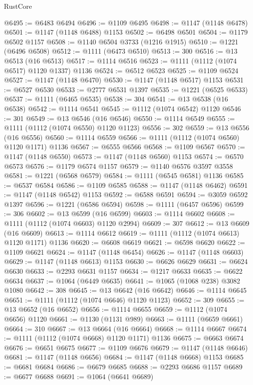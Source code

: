 \begin{lexlean}{RustCore}
\begin{coremodule}
@6495 := @6483 @6494
@6496 := @1109 @6495
@6498 := @1147 (@1148 @6478)
@6501 := @1147 (@1148 @6488) @1153
@6502 := @6498 @6501
@6504 := @1179 @6502 @1157
@6508 := @1140 @6504 @3733 (@1216 @1915)
@6510 := @1221 (@6496 @6508)
@6512 := @1111 (@6473 @6510)
@6513 := 300
@6516 := @13 @6513 (@16 @6513)
@6517 := @1114 @6516
@6523 := @1111 (@1112 (@1074 @6517) @1120 @1337) @1136
@6524 := @6512 @6523
@6525 := @1109 @6524
@6527 := @1147 (@1148 @6470)
@6530 := @1147 (@1148 @6517) @1153
@6531 := @6527 @6530
@6533 := @2777 @6531 @1397
@6535 := @1221 (@6525 @6533)
@6537 := @1111 (@6465 @6535)
@6538 := 304
@6541 := @13 @6538 (@16 @6538)
@6542 := @1114 @6541
@6545 := @1112 (@1074 @6542) @1120
@6546 := 301
@6549 := @13 @6546 (@16 @6546)
@6550 := @1114 @6549
@6555 := @1111 (@1112 (@1074 @6550) @1120 @1123)
@6556 := 302
@6559 := @13 @6556 (@16 @6556)
@6560 := @1114 @6559
@6566 := @1111 (@1112 (@1074 @6560) @1120 @1171) @1136
@6567 := @6555 @6566
@6568 := @1109 @6567
@6570 := @1147 (@1148 @6550)
@6573 := @1147 (@1148 @6560) @1153
@6574 := @6570 @6573
@6576 := @1179 @6574 @1157
@6579 := @1140 @6576 @3597 @3558
@6581 := @1221 (@6568 @6579)
@6584 := @1111 (@6545 @6581) @1136
@6585 := @6537 @6584
@6586 := @1109 @6585
@6588 := @1147 (@1148 @6462)
@6591 := @1147 (@1148 @6542) @1153
@6592 := @6588 @6591
@6594 := @3059 @6592 @1397
@6596 := @1221 (@6586 @6594)
@6598 := @1111 (@6457 @6596)
@6599 := 306
@6602 := @13 @6599 (@16 @6599)
@6603 := @1114 @6602
@6608 := @1111 (@1112 (@1074 @6603) @1120 @2994)
@6609 := 307
@6612 := @13 @6609 (@16 @6609)
@6613 := @1114 @6612
@6619 := @1111 (@1112 (@1074 @6613) @1120 @1171) @1136
@6620 := @6608 @6619
@6621 := @6598 @6620
@6622 := @1109 @6621
@6624 := @1147 (@1148 @6454)
@6626 := @1147 (@1148 @6603)
@6629 := @1147 (@1148 @6613) @1153
@6630 := @6626 @6629
@6631 := @6624 @6630
@6633 := @2293 @6631 @1157
@6634 := @1217 @6633
@6635 := @6622 @6634
@6637 := @1064 (@6449 @6635)
@6641 := @1065 (@1068 @238) @3082 @1080
@6642 := 308
@6645 := @13 @6642 (@16 @6642)
@6646 := @1114 @6645
@6651 := @1111 (@1112 (@1074 @6646) @1120 @1123)
@6652 := 309
@6655 := @13 @6652 (@16 @6652)
@6656 := @1114 @6655
@6659 := @1112 (@1074 @6656) @1120
@6661 := @1130 (@1131 @989)
@6663 := @1111 (@6659 @6661)
@6664 := 310
@6667 := @13 @6664 (@16 @6664)
@6668 := @1114 @6667
@6674 := @1111 (@1112 (@1074 @6668) @1120 @1171) @1136
@6675 := @6663 @6674
@6676 := @6651 @6675
@6677 := @1109 @6676
@6679 := @1147 (@1148 @6646)
@6681 := @1147 (@1148 @6656)
@6684 := @1147 (@1148 @6668) @1153
@6685 := @6681 @6684
@6686 := @6679 @6685
@6688 := @2293 @6686 @1157
@6689 := @6677 @6688
@6691 := @1064 (@6641 @6689)

\end{coremodule}
\end{lexlean}
